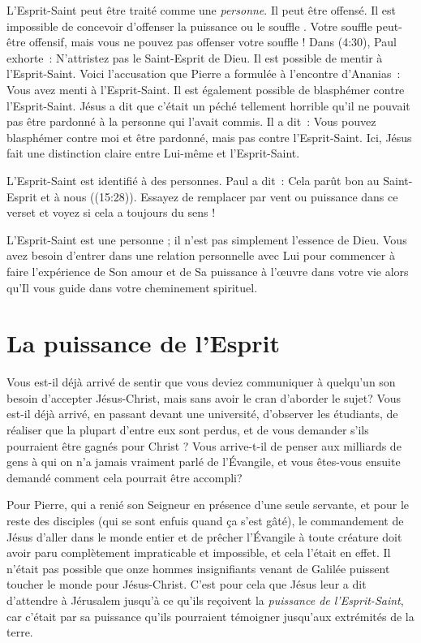 \begin{specialpar}{}
L'Esprit-Saint peut être traité comme une \emph{personne}. Il peut être offensé.
 Il est impossible de concevoir d'offenser \og la puissance \fg{} ou
 \og le souffle \fg{}. Votre souffle peut-être offensif, mais vous ne pouvez
 pas offenser votre souffle ! Dans (4:30), Paul exhorte~:
 \og N'attristez pas le Saint-Esprit de Dieu. \fg{}
 Il est possible de mentir à l'Esprit-Saint. Voici l'accusation que Pierre a
 formulée à l'encontre d'Ananias~:
 \og Vous avez menti à l'Esprit-Saint. \fg{}
 Il est également possible de blasphémer contre l'Esprit-Saint.
 Jésus a dit que c'était un péché tellement horrible qu'il ne pouvait pas
 être pardonné à la personne qui l'avait commis. Il a dit~:
 \og Vous pouvez blasphémer contre moi et être pardonné, mais pas contre
 l'Esprit-Saint. \fg{}
 Ici, Jésus fait une distinction claire entre Lui-même et l'Esprit-Saint.
\end{specialpar}

L'Esprit-Saint est identifié à des personnes. Paul a dit~:
 \og Cela parût bon au Saint-Esprit et à nous \fg{}
 ((15:28)).
 Essayez de remplacer par vent ou puissance dans ce verset et voyez si cela
 a toujours du sens !

L'Esprit-Saint est une personne ; il n'est pas simplement l'essence de Dieu.
 Vous avez besoin d'entrer dans une relation personnelle avec Lui pour
 commencer à faire l'expérience de Son amour et de Sa puissance à l'œuvre
 dans votre vie alors qu'Il vous guide dans votre cheminement spirituel.


\section{La puissance de l'Esprit}

Vous est-il déjà arrivé de sentir que vous deviez communiquer à quelqu'un
son besoin d'accepter Jésus-Christ, mais sans avoir le cran d'aborder le sujet?
 Vous est-il déjà arrivé, en passant devant une université,
 d'observer les étudiants, de réaliser que la plupart d'entre eux sont perdus,
 et de vous demander s'ils pourraient être gagnés pour Christ ?
 Vous arrive-t-il de penser aux milliards de gens à qui on n'a jamais vraiment
 parlé de l'Évangile, et vous êtes-vous ensuite demandé comment cela pourrait
 être accompli?

\begin{specialpar}{}
Pour Pierre, qui a renié son Seigneur en présence d'une seule servante,
 et pour le reste des disciples (qui se sont enfuis quand ça s'est gâté),
 le commandement de Jésus d'aller dans le monde entier et de prêcher
 l'Évangile à toute créature doit avoir paru complètement impraticable et
 impossible, et cela l'était en effet.
 Il n'était pas possible que onze hommes insignifiants venant de Galilée
 puissent toucher le monde pour Jésus-Christ.
 C'est pour cela que Jésus leur a dit d'attendre à Jérusalem jusqu'à ce
 qu'ils reçoivent la \emph{puissance de l'Esprit-Saint}, car c'était par
 sa puissance qu'ils pourraient témoigner jusqu'aux extrémités de la terre.
\end{specialpar}

